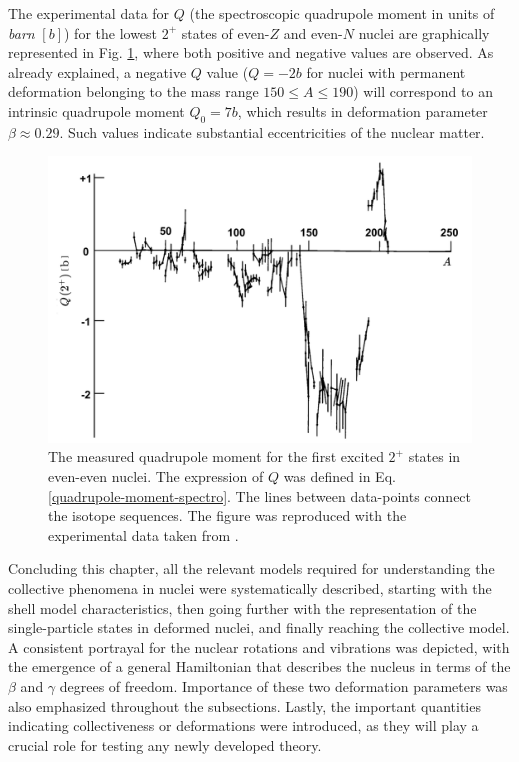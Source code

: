 The experimental data for $Q$ (the spectroscopic quadrupole moment in units of \emph{barn} $[b]$) for the lowest $2^+$ states of even-$Z$ and even-$N$ nuclei are graphically represented in Fig. \ref{experimental-quadrupole-2Plus-states}, where both positive and negative values are observed. As already explained, a negative $Q$ value ($Q=-2b$ for nuclei with permanent deformation belonging to the mass range $150\leq A \leq 190$) will correspond to an intrinsic quadrupole moment $Q_0=7b$, which results in deformation parameter $\beta\approx 0.29$. Such values indicate substantial eccentricities of the nuclear matter.
\begin{figure}
    \centering
    \includegraphics[scale=0.25]{Chapters/Figures/2Plus_spectroscopicQ.pdf}
    \caption{The measured quadrupole moment for the first excited $2^+$ states in even-even nuclei. The expression of $Q$ was defined in Eq. \ref{quadrupole-moment-spectro}. The lines between data-points connect the isotope sequences. The figure was reproduced with the experimental data taken from \cite{krane1991introductory}.}
    \label{experimental-quadrupole-2Plus-states}
\end{figure}

Concluding this chapter, all the relevant models required for understanding the collective phenomena in nuclei were systematically described, starting with the shell model characteristics, then going further with the representation of the single-particle states in deformed nuclei, and finally reaching the collective model. A consistent portrayal for the nuclear rotations and vibrations was depicted, with the emergence of a general Hamiltonian that describes the nucleus in terms of the $\beta$ and $\gamma$ degrees of freedom. Importance of these two deformation parameters was also emphasized throughout the subsections. Lastly, the important quantities indicating collectiveness or deformations were introduced, as they will play a crucial role for testing any newly developed theory.